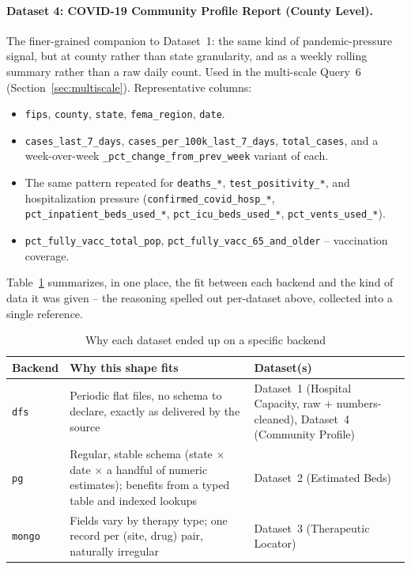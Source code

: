 \documentclass[11pt,a4paper]{article}
\begin{document}
\paragraph{Dataset 4: COVID-19 Community Profile Report (County Level).}
The finer-grained companion to Dataset~1: the same kind of pandemic-pressure signal,
but at county rather than state granularity, and as a weekly rolling summary rather
than a raw daily count. Used in the multi-scale Query~6
(Section~\ref{sec:multiscale}). Representative columns:
\begin{itemize}[leftmargin=1.6em]
  \item \texttt{fips}, \texttt{county}, \texttt{state}, \texttt{fema\_region},
    \texttt{date}.
  \item \texttt{cases\_last\_7\_days}, \texttt{cases\_per\_100k\_last\_7\_days},
    \texttt{total\_cases}, and a week-over-week \texttt{\_pct\_change\_from\_prev\_week}
    variant of each.
  \item The same pattern repeated for \texttt{deaths\_*}, \texttt{test\_positivity\_*},
    and hospitalization pressure (\texttt{confirmed\_covid\_hosp\_*},
    \texttt{pct\_inpatient\_beds\_used\_*}, \texttt{pct\_icu\_beds\_used\_*},
    \texttt{pct\_vents\_used\_*}).
  \item \texttt{pct\_fully\_vacc\_total\_pop}, \texttt{pct\_fully\_vacc\_65\_and\_older}
    -- vaccination coverage.
\end{itemize}


Table~\ref{tab:roles} summarizes, in one place, the fit between each backend and the
kind of data it was given -- the reasoning spelled out per-dataset above, collected
into a single reference.

\begin{table}[htbp]
\centering
\small
\begin{tabular}{@{}l p{4.4cm} p{6.4cm}@{}}
\toprule
\textbf{Backend} & \textbf{Why this shape fits} & \textbf{Dataset(s)} \\
\midrule
\texttt{dfs} & Periodic flat files, no schema to declare, exactly as delivered by the source & Dataset~1 (Hospital Capacity, raw + numbers-cleaned), Dataset~4 (Community Profile) \\
\texttt{pg}  & Regular, stable schema (state $\times$ date $\times$ a handful of numeric estimates); benefits from a typed table and indexed lookups & Dataset~2 (Estimated Beds) \\
\texttt{mongo} & Fields vary by therapy type; one record per (site, drug) pair, naturally irregular & Dataset~3 (Therapeutic Locator) \\
\bottomrule
\end{tabular}
\caption{Why each dataset ended up on a specific backend}
\label{tab:roles}
\end{table}
\end{document}
